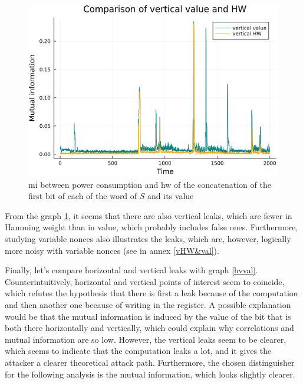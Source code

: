 \documentclass[11pt,technote]{IEEEtran}
\begin{document}
		\begin{figure}[h!]
			\centering
			\includegraphics[scale=0.4]{img_files/vertical_one_bit}
			\caption{\ac{mi} between power consumption and \ac{hw} of the concatenation of the first bit of each of the word of $S$ and its value}
			\label{vHW}
		\end{figure}
		
		From the graph \ref{vHW}, it seems that there are also vertical leaks, which are fewer in Hamming weight than in value, which probably includes false ones. Furthermore, studying variable nonces also illustrates the leaks, which are, however, logically more noisy with variable nonces (see in annex \ref{vHW&val}).
		
		Finally, let's compare horizontal and vertical leaks with graph \ref{hvval}. Counterintuitively, horizontal and vertical points of interest seem to coincide, which refutes the hypothesis that there is first a leak because of the computation and then another one because of writing in the register. A possible explanation would be that the mutual information is induced by the value of the bit that is both there horizontally and vertically, which could explain why correlations and mutual information are so low. However, the vertical leaks seem to be clearer, which seems to indicate that the computation leaks a lot, and it gives the attacker a clearer theoretical attack path. Furthermore, the chosen distinguisher for the following analysis is the mutual information, which looks slightly clearer.
		
\end{document}
